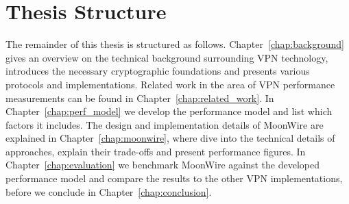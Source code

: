 \section{Thesis Structure}
The remainder of this thesis is structured as follows.
Chapter~\ref{chap:background} gives an overview on the technical background surrounding VPN technology, introduces the necessary cryptographic foundations and presents various protocols and implementations. 
Related work in the area of VPN performance measurements can be found in Chapter~\ref{chap:related_work}. %
In Chapter~\ref{chap:perf_model} we develop the performance model and list which factors it includes.
The design and implementation details of MoonWire are explained in Chapter~\ref{chap:moonwire}, where dive into the technical details of approaches, explain their trade-offs and present performance figures.
In Chapter~\ref{chap:evaluation} we benchmark MoonWire against the developed performance model and compare the results to the other VPN implementations, before we conclude in Chapter~\ref{chap:conclusion}.

